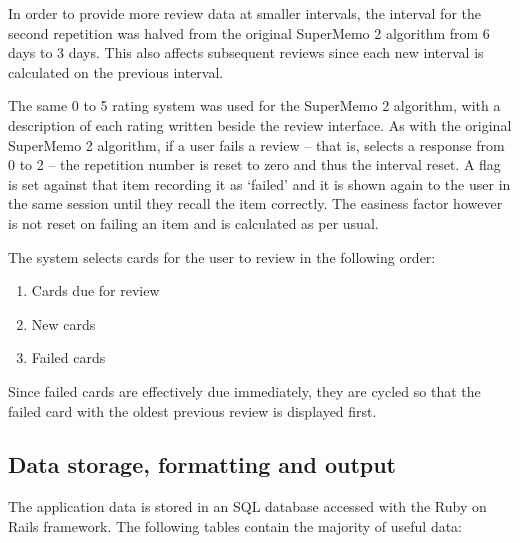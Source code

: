 In order to provide more review data at smaller intervals, the interval for the second 
repetition was halved from the original SuperMemo 2 algorithm from 6 days to 3 days.
This also affects subsequent reviews since each new interval is calculated on the
previous interval.

The same 0 to 5 rating system was used for the SuperMemo 2 algorithm, with a description of
each rating written beside the review interface. As with the original SuperMemo 2 algorithm,
if a user fails a review -- that is, selects 
a response from 0 to 2 -- the repetition number is reset to zero and thus the interval
reset. A flag is set against that item recording it as `failed' and it is shown
again to the user in the same session until they recall the item correctly.
The easiness factor however is not reset on failing an item and is calculated as per usual.

The system selects cards for the user to review in the following order:
\begin{enumerate}
  \item Cards due for review
  \item New cards
  \item Failed cards
\end{enumerate}

Since failed cards are effectively due immediately, they are cycled so that the failed
card with the oldest previous review is displayed first.

\subsection{Data storage, formatting and output}

The application data is stored in an SQL database accessed with the Ruby on Rails
framework. The following tables contain the majority of useful data:


